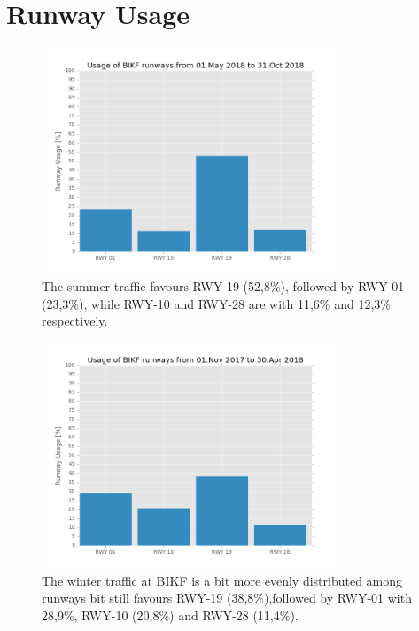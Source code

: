 \chapter{Runway Usage}\label{cha:RWY_use}


\begin{figure}[]
    \centering
    \includegraphics[width=0.8\textwidth]{graphics/fig_runway_usage_summer}
    \caption[Summer runway usage at BIKF]{The summer traffic favours RWY-19 (52,8\%), followed by RWY-01 (23,3\%), while RWY-10 and RWY-28 are with 11,6\% and 12,3\% respectively.}
    \label{fig:runway_usage_summer}
\end{figure}


\begin{figure}[]
    \centering
    \includegraphics[width=0.8\textwidth]{graphics/fig_runway_usage_winter}
    \caption[Winter runway usage at BIKF]{The winter traffic at BIKF is a bit more evenly distributed among runways bit still favours RWY-19 (38,8\%),followed by RWY-01 with 28,9\%, RWY-10 (20,8\%) and RWY-28 (11,4\%).}
    \label{fig:runway_usage_winter}
\end{figure}


